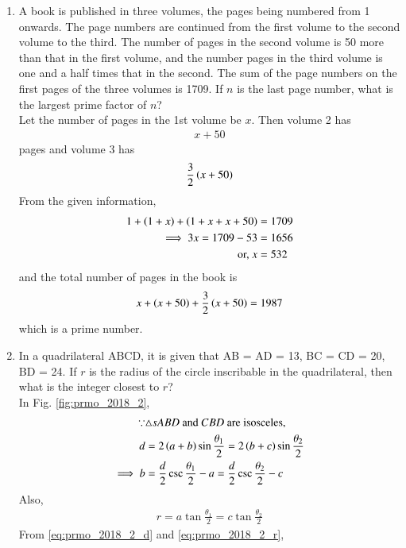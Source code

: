 \documentclass[journal,12pt,twocolumn]{IEEEtran}
\begin{document}
\begin{enumerate}[label=\arabic*]

\item A book is published in three volumes, the pages being numbered from 1 onwards. The page numbers are continued from the first volume to the second volume to the third. The number of pages in the second volume is 50 more than that in the first volume, and the number pages in the third volume is one and a half times that in the second. The sum of the page numbers on the first pages of the three volumes is 1709. If $n$ is the last page number, what is the largest prime factor of $n$?
\\
\solution Let the number of pages in the 1st volume be $x$. Then volume 2 has
\begin{align}
x+50
\end{align}
pages and volume 3 has 
\begin{align}
\frac{3}{2}\left(x+50\right)
\end{align}
From the given information, 
\begin{align}
1 + \left(1+x\right) + \left(1+x+x+50\right) &= 1709
\\
\implies 3x =  1709-53 &= 1656
\\
\text{or, } x  &= 532
\end{align}
%
and the total number of pages in the book is 
\begin{align}
x + \left(x+50\right)+\frac{3}{2}\left(x+50\right) = 1987
\end{align}
%
which is a prime number.
\item In a quadrilateral ABCD, it is given that AB = AD = 13, BC = CD = 20, BD = 24. If $r$ is the radius of the circle inscribable in the quadrilateral, then what is the integer closest to $r$? 
\\
\solution In Fig. \ref{fig:prmo_2018_2},
%
\begin{align}
\because &\triangle s ABD \text{ and } CBD \text{ are isosceles},
\\
d &= 2\brak{a+b}\sin \frac{\theta_1}{2} =2\brak{b+c}\sin \frac{\theta_2}{2}
\\
\implies b &= \frac{d}{2} \csc \frac{\theta_1}{2} -a 
= \frac{d}{2} \csc \frac{\theta_2}{2} -c
\label{eq:prmo_2018_2_d}
\end{align}
%
Also,
\begin{align}
\label{eq:prmo_2018_2_r}
r = a\tan \frac{\theta_1}{2} =c\tan \frac{\theta_2}{2}
\end{align}
%
From \eqref{eq:prmo_2018_2_d} and \eqref{eq:prmo_2018_2_r}, 

\end{enumerate}
\end{document}
